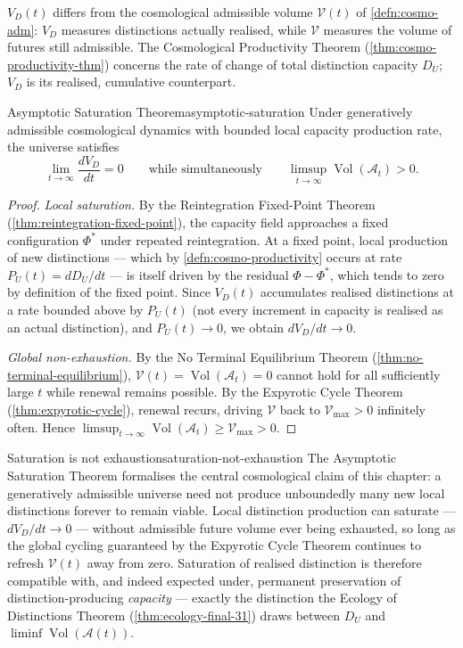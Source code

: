 \documentclass[12pt,twoside,openright]{book}
\newcommand{\adm}{\mathcal{A}}
\newcommand{\Vol}{\operatorname{Vol}}
\begin{document}
$V_D(t)$ differs from the cosmological admissible volume
$\mathcal{V}(t)$ of \cref{defn:cosmo-adm}: $V_D$ measures
distinctions actually realised, while $\mathcal{V}$ measures
the volume of futures still admissible. The Cosmological
Productivity Theorem (\cref{thm:cosmo-productivity-thm})
concerns the rate of change of total distinction capacity
$D_U$; $V_D$ is its realised, cumulative counterpart.

\begin{theorem}{Asymptotic Saturation Theorem}{asymptotic-saturation}
  Under generatively admissible cosmological dynamics with
  bounded local capacity production rate, the universe
  satisfies
  \[
    \lim_{t\to\infty} \frac{dV_D}{dt} = 0
    \qquad\text{while simultaneously}\qquad
    \limsup_{t\to\infty} \Vol(\mathcal{A}_t) > 0.
  \]
\end{theorem}

\begin{proof}
  \emph{Local saturation.} By the Reintegration Fixed-Point
  Theorem (\cref{thm:reintegration-fixed-point}), the
  capacity field approaches a fixed configuration $\Phi^*$
  under repeated reintegration. At a fixed point, local
  production of new distinctions --- which by
  \cref{defn:cosmo-productivity} occurs at rate
  $P_U(t) = dD_U/dt$ --- is itself driven by the residual
  $\Phi - \Phi^*$, which tends to zero by definition of the
  fixed point. Since $V_D(t)$ accumulates realised
  distinctions at a rate bounded above by $P_U(t)$ (not
  every increment in capacity is realised as an actual
  distinction), and $P_U(t)\to0$, we obtain
  $dV_D/dt \to 0$.

  \emph{Global non-exhaustion.} By the No Terminal
  Equilibrium Theorem (\cref{thm:no-terminal-equilibrium}),
  $\mathcal{V}(t) = \Vol(\mathcal{A}_t) = 0$ cannot hold for
  all sufficiently large $t$ while renewal remains possible.
  By the Expyrotic Cycle Theorem
  (\cref{thm:expyrotic-cycle}), renewal recurs, driving
  $\mathcal{V}$ back to $\mathcal{V}_{\max} > 0$ infinitely
  often. Hence
  $\limsup_{t\to\infty}\Vol(\mathcal{A}_t) \ge
  \mathcal{V}_{\max} > 0$.
\end{proof}

\begin{remark}{Saturation is not exhaustion}{saturation-not-exhaustion}
  The Asymptotic Saturation Theorem formalises the central
  cosmological claim of this chapter: a generatively
  admissible universe need not produce unboundedly many new
  local distinctions forever to remain viable. Local
  distinction production can saturate --- $dV_D/dt\to0$ ---
  without admissible future volume ever being exhausted, so
  long as the global cycling guaranteed by the Expyrotic
  Cycle Theorem continues to refresh $\mathcal{V}(t)$ away
  from zero. Saturation of realised distinction is therefore
  compatible with, and indeed expected under, permanent
  preservation of distinction-producing \emph{capacity} ---
  exactly the distinction the Ecology of Distinctions
  Theorem (\cref{thm:ecology-final-31}) draws between
  $D_U$ and $\liminf\Vol(\adm(t))$.
\end{remark}
\end{document}
